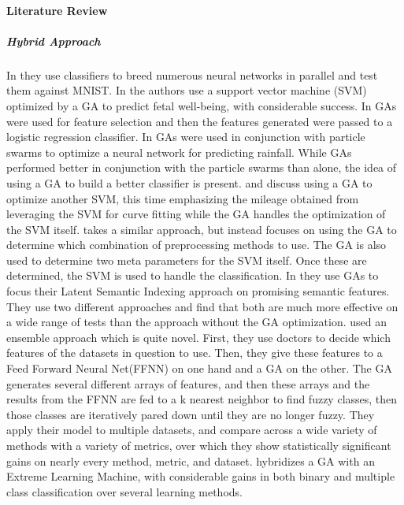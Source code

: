 \paragraph{Literature Review}
\subparagraph{Hybrid Approach}In \cite{schuman_spatiotemporal_2014} they use classifiers to breed numerous neural networks in parallel and test them against MNIST.  In \cite{ocak_medical_2013} the authors use a support vector machine (SVM) optimized by a GA to predict fetal well-being, with considerable success.  In \cite{marchetti_improving_2013} GAs were used for feature selection and then the features generated were passed to a logistic regression classifier.   In \cite{wu_evolving_2015} GAs were used in conjunction with particle swarms to optimize a neural network for predicting rainfall.  While GAs performed better in conjunction with the particle swarms than alone, the idea of using a GA to build a better classifier is present.  \cite{chou_optimizing_2014} and \cite{duan_characterization_2014} discuss using a GA to optimize another SVM, this time emphasizing the mileage obtained from leveraging the SVM for curve fitting while the GA handles the optimization of the SVM itself.  \cite{devos_simultaneous_2014} takes a similar approach, but instead focuses on using the GA to determine which combination of preprocessing methods to use.  The GA is also used to determine two meta parameters for the SVM itself.  Once these are determined, the SVM is used to handle the classification.  In \cite{uysal_text_2014} they use GAs to focus their Latent Semantic Indexing approach on promising semantic features.  They use two different approaches and find that both are much more effective on a wide range of tests than the approach without the GA optimization. \cite{salari_novel_2014} used an ensemble approach which is quite novel.  First, they use doctors to decide which features of the datasets in question to use.  Then, they give these features to a Feed Forward Neural Net(FFNN) on one hand and a GA on the other.  The GA generates several different arrays of features, and then these arrays and the results from the FFNN are fed to a k nearest neighbor to find fuzzy classes, then those classes are iteratively pared down until they are no longer fuzzy.  They apply their model to multiple datasets, and compare across a wide variety of methods with a variety of metrics, over which they show statistically significant gains on nearly every method, metric, and dataset.  \cite{alexandre_hybridizing_2015} hybridizes a GA with an Extreme Learning Machine, with considerable gains in both binary and multiple class classification over several learning methods.


